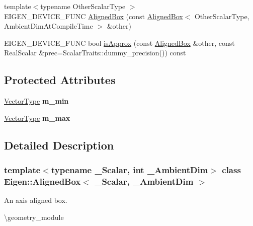 \begin{DoxyCompactItemize}
\item 
{\footnotesize template$<$typename Other\+Scalar\+Type $>$ }\\E\+I\+G\+E\+N\+\_\+\+D\+E\+V\+I\+C\+E\+\_\+\+F\+U\+NC \mbox{\hyperlink{class_eigen_1_1_aligned_box_afa9f0963fda762e5ca3633caec7bf8f2}{Aligned\+Box}} (const \mbox{\hyperlink{class_eigen_1_1_aligned_box}{Aligned\+Box}}$<$ Other\+Scalar\+Type, Ambient\+Dim\+At\+Compile\+Time $>$ \&other)
\item 
E\+I\+G\+E\+N\+\_\+\+D\+E\+V\+I\+C\+E\+\_\+\+F\+U\+NC bool \mbox{\hyperlink{class_eigen_1_1_aligned_box_a9d21b1102d3b6944a80a563d3974c83c}{is\+Approx}} (const \mbox{\hyperlink{class_eigen_1_1_aligned_box}{Aligned\+Box}} \&other, const Real\+Scalar \&prec=Scalar\+Traits\+::dummy\+\_\+precision()) const
\end{DoxyCompactItemize}
\subsection*{Protected Attributes}
\begin{DoxyCompactItemize}
\item 
\mbox{\label{class_eigen_1_1_aligned_box_a083e6c4e560a6d766486afa9b209f456}} 
\mbox{\hyperlink{class_eigen_1_1_matrix}{Vector\+Type}} {\bfseries m\+\_\+min}
\item 
\mbox{\label{class_eigen_1_1_aligned_box_acfc2c4b47b571843aad1e68e823022be}} 
\mbox{\hyperlink{class_eigen_1_1_matrix}{Vector\+Type}} {\bfseries m\+\_\+max}
\end{DoxyCompactItemize}


\subsection{Detailed Description}
\subsubsection*{template$<$typename \+\_\+\+Scalar, int \+\_\+\+Ambient\+Dim$>$\newline
class Eigen\+::\+Aligned\+Box$<$ \+\_\+\+Scalar, \+\_\+\+Ambient\+Dim $>$}

An axis aligned box. 

\textbackslash{}geometry\+\_\+module


